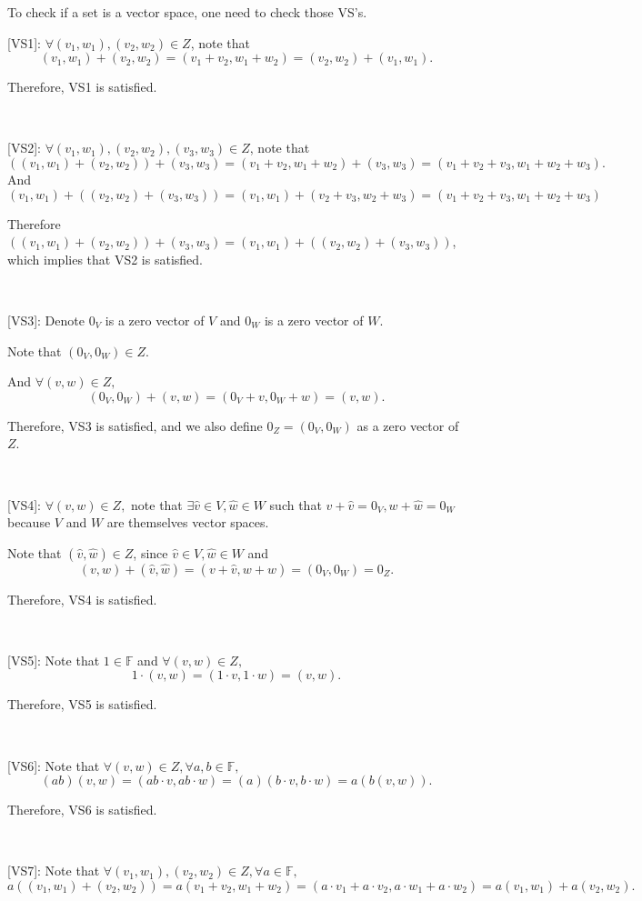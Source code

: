 \documentclass[12pt]{article}%
\begin{document}
To check if a set is a vector space, one need to check those VS's.

[VS1]: $\forall (v_1,w_1),(v_2,w_2)\in Z $, note that $$(v_1,w_1)+(v_2,w_2)=(v_1+v_2,w_1+w_2)=(v_2,w_2)+(v_1,w_1).$$ 

Therefore, VS1 is satisfied. 

~\

[VS2]: $\forall (v_1,w_1),(v_2,w_2),(v_3,w_3)\in Z$, note that $$((v_1,w_1)+(v_2,w_2))+(v_3,w_3)=(v_1+v_2,w_1+w_2)+(v_3,w_3)=(v_1+v_2+v_3,w_1+w_2+w_3).$$ And $$(v_1,w_1)+((v_2,w_2)+(v_3,w_3))=(v_1,w_1)+(v_2+v_3,w_2+w_3)=(v_1+v_2+v_3,w_1+w_2+w_3)$$

Therefore $((v_1,w_1)+(v_2,w_2))+(v_3,w_3)=(v_1,w_1)+((v_2,w_2)+(v_3,w_3))$, which implies that VS2 is satisfied. 

~\

[VS3]: Denote $0_V$ is a zero vector of $V$ and $0_W$ is a zero vector of $W$. 

Note that $(0_V,0_W) \in Z.$

And $\forall (v,w)\in Z,$ $$(0_V,0_W)+(v,w) = (0_V+v,0_W+w)=(v,w).$$ 

Therefore, VS3 is satisfied, and we also define $0_Z = (0_V,0_W)$ as a zero vector of $Z$.

~\

[VS4]: $\forall (v,w) \in Z,$ note that $\exists \hat v \in V, \hat w \in W$ such that $v+\hat v=0_V, w+\hat w = 0_W$ because $V$ and $W$ are themselves vector spaces.

Note that $(\hat v, \hat w) \in Z$, since $\hat v \in V, \hat w \in W$ and $$(v,w)+(\hat v, \hat w)=(v+\hat v, w+\hat w)=(0_V,0_W)=0_Z.$$

Therefore, VS4 is satisfied. 

~\

[VS5]: Note that $1\in \mathbb{F}$ and $\forall (v,w)\in Z,$ $$ 1\cdot (v,w)=(1\cdot v, 1\cdot w)=(v,w).$$

Therefore, VS5 is satisfied. 

~\ 

[VS6]: Note that $\forall (v,w)\in Z, \forall a,b \in \mathbb{F},$ $$(ab)(v,w)=(ab\cdot v,ab\cdot w)=(a)(b\cdot v,b\cdot w)=a(b(v,w)).$$

Therefore, VS6 is satisfied. 

~\ 

[VS7]: Note that $\forall (v_1,w_1), (v_2,w_2)\in Z, \forall a \in \mathbb{F},$ $$a((v_1,w_1)+(v_2,w_2))=a(v_1+v_2,w_1+w_2)=(a\cdot v_1 + a\cdot v_2, a\cdot w_1 + a\cdot w_2)=a(v_1,w_1)+a(v_2,w_2).$$ 
\end{document}
